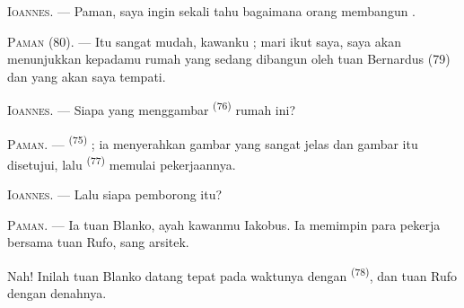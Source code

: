 %

\VUsaut{6.0mm}
\VUsaut{1.4mm}
\VUsaut{2.2mm}

\VUsaut{3.0mm}

\textsc{Ioannes}. --- Paman, saya ingin sekali tahu bagaimana orang
membangun .

\textsc{Paman} (80). --- Itu sangat mudah, kawanku ; mari ikut saya,
saya akan menunjukkan kepadamu rumah yang sedang dibangun oleh tuan
Bernardus (79) dan yang akan saya tempati.

\textsc{Ioannes}. --- Siapa yang menggambar 
\textsuperscript{(76)} rumah ini?

\textsc{Paman}. ---  \textsuperscript{(75)} ; ia
menyerahkan gambar yang sangat jelas dan gambar itu disetujui, lalu
 \textsuperscript{(77)} memulai pekerjaannya.

\textsc{Ioannes}. --- Lalu siapa pemborong itu?

\textsc{Paman}. --- Ia tuan Blanko, ayah kawanmu Iakobus. Ia memimpin
para pekerja bersama tuan Rufo, sang arsitek.

Nah! Inilah tuan Blanko datang tepat pada waktunya dengan
 \textsuperscript{(78)}, dan tuan Rufo dengan
denahnya.

